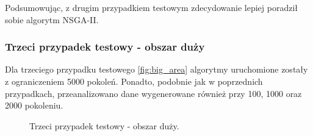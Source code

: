 \documentclass[twoside]{iisthesis}
\begin{document}
Podsumowując, z drugim przypadkiem testowym zdecydowanie lepiej poradził sobie algorytm NSGA-II.\newpage
\subsubsection{Trzeci przypadek testowy - obszar duży}
Dla trzeciego przypadku testowego \eqref{fig:big_area} algorytmy uruchomione zostały z ograniczeniem 5000 pokoleń. Ponadto, podobnie jak w poprzednich przypadkach, przeanalizowano dane wygenerowane również przy 100, 1000 oraz 2000 pokoleniu.
\begin{figure}[H]
	\centering
	\caption{Trzeci przypadek testowy - obszar duży.}
	\label{fig:big_area}
\end{figure}
\end{document}

